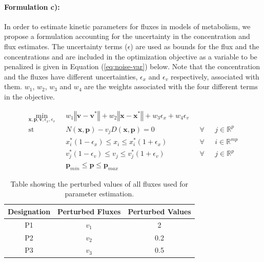 \documentclass[10pt]{article}
\begin{document}
	\paragraph{Formulation c):}
	In order to estimate kinetic parameters for fluxes in models of metabolism, we propose a formulation accounting for the uncertainty in the concentration and flux estimates. The uncertainty terms ($\epsilon$) are used as bounds for the flux and the concentrations and are included in the optimization objective as a variable to be penalized is given in Equation (\ref{eq:noise-var}) below. Note that the concentration and the fluxes have different uncertainties, $\epsilon_x$ and $\epsilon_v$ respectively, associated with them. $w_1$, $w_2$, $w_3$ and $w_4$ are the weights associated with the four different terms in the objective. 
	\begin{center}
		\begin{subequations}\label{eq:noise-var}
			\begin{align}
			\underset{\mathbf{x},\mathbf{p},\mathbf{v},\epsilon_x,\epsilon_v}{\mathrm{min}} & \text{      }w_1\left\Vert \mathbf{v}-\mathbf{v}^*\right\Vert + w_2\left\Vert \mathbf{x}-\mathbf{x}^*\right\Vert + w_3\epsilon_x + w_4\epsilon_v\\
			\mathrm{st}& \text{      }N(\mathbf{x},\mathbf{p}) - v_jD(\mathbf{x},\mathbf{p}) = 0 & \text{  }\forall & \text{ }j\in\mathbb{R}^p\\
			& \text{      }x^*_i(1-\epsilon_x)\le x_i \le x^*_i(1+\epsilon_x) & \text{  }\forall & \text{ }i\in\mathbb{R}^{mp}\\	
			& \text{      }v^*_j(1-\epsilon_v)\le v_j \le v^*_j(1+\epsilon_v) & \text{  }\forall & \text{ }j\in\mathbb{R}^{p}\\		
			& \text{      }\mathbf{p}_{min} \le \mathbf{p} \le \mathbf{p}_{max}
			\end{align}
		\end{subequations}
	\end{center}
	
	\begin{table}[!tbhp]
		\caption{Table showing the perturbed values of all fluxes used for parameter estimation.}
		\begin{center}				
			\begin{tabular}{ccc}
				Designation & Perturbed Fluxes & Perturbed Values\\
				\hline
				P1 & $v_1$ & 2\\
				P2 & $v_2$ & 0.2\\
				P3 & $v_3$ & 0.5
			\end{tabular}
		\end{center}	
		\label{tab:pval}
	\end{table}
\end{document}
